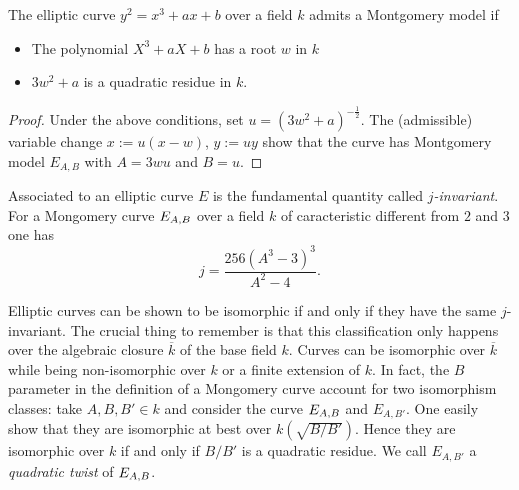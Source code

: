 \documentclass[../main/main.tex]{subfiles}
\begin{document}
\begin{proposition}
	The elliptic curve $y^2 = x^3 + ax + b$ over a field $k$ admits a Montgomery model if
	\begin{itemize}
		\item The polynomial $X^3 + aX + b$ has a root $w$ in $k$
		\item $3w^2 + a$ is a quadratic residue in $k$.
	\end{itemize}
\end{proposition}
\begin{proof}
	Under the above conditions, set $u = (3w^2+a)^{-\frac{1}{2}}$.
	The (admissible) variable change $x:= u(x-w)$, $y:= uy$ show that the curve has Montgomery model $E_{A, B}$ with $A = 3wu$ and $B=u$.
\end{proof}

Associated to an elliptic curve $E$ is the fundamental quantity called $j$\textit{-invariant}.
For a Mongomery curve $E_{A, B}$ over a field $k$ of caracteristic different from $2$ and $3$ one has
\[
	j = \frac{256(A^3-3)^3}{A^2 - 4}.
\]

Elliptic curves can be shown to be isomorphic if and only if they have the same $j$-invariant.
The crucial thing to remember is that this classification only happens over the algebraic closure $\overbar{k}$ of the base field $k$.
Curves can be isomorphic over $\overbar{k}$ while being non-isomorphic over $k$ or a finite extension of $k$.
In fact, the $B$ parameter in the definition of a Mongomery curve account for two isomorphism classes: take $A, B, B'\in k$ and consider the curve $E_{A, B}$ and $E_{A, B'}$.
One easily show that they are isomorphic at best over $k(\sqrt{B/B'})$.
Hence they are isomorphic over $k$ if and only if $B/B'$ is a quadratic residue.
We call $E_{A, B'}$ a \textit{quadratic twist} of $E_{A, B}$.
\end{document}
